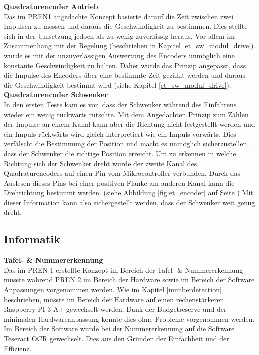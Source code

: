 \documentclass[../../main.tex]{subfiles}
\begin{document}
\textbf{Quadraturencoder Antrieb}\\
Das im PREN1 angedachte Konzept basierte darauf die Zeit zwischen zwei Impulsen zu messen und daraus die Geschwindigkeit zu bestimmen. Dies stellte sich in der Umsetzung jedoch als zu wenig zuverlässig heraus. Vor allem im Zusammenhang mit der Regelung (beschrieben in Kapitel \ref{et_sw_modul_drive}) wurde es mit der unzuverlässigen Auswertung des Encoders unmöglich eine konstante Geschwindigkeit zu halten. Daher wurde das Prinzip angepasst, dass die Impulse des Encoders über eine bestimmte Zeit gezählt werden und daraus die Geschwindigkeit bestimmt wird (siehe Kapitel \ref{et_sw_modul_drive}).\\

\textbf{Quadraturencoder Schwenker}\\
In den ersten Tests kam es vor, dass der Schwenker während des Einfahrens wieder ein wenig rückwärts rutschte. Mit dem Angedachten Prinzip zum Zählen der Impulse an einem Kanal kann aber die Richtung nicht festgestellt werden und ein Impuls rückwärts wird gleich interpretiert wie ein Impuls vorwärts. Dies verfälscht die Bestimmung der Position und macht es unmöglich sicherzustellen, dass der Schwenker die richtige Position erreicht. Um zu erkennen in welche Richtung sich der Schwenker dreht wurde der zweite Kanal des Quadraturencoders auf einen Pin vom Mikrocontroller verbunden. Durch das Auslesen dieses Pins bei einer positiven Flanke am anderen Kanal kann die Drehrichtung bestimmt werden. (siehe Abbildung \ref{fig:et_encoder} auf Seite \pageref{fig:et_encoder}) Mit dieser Information kann also sichergestellt werden, dass der Schwenker weit genug dreht.\\

\subsection{Informatik}

\textbf{Tafel- \& Nummererkennung}\\
Das im PREN 1 erstellte Konzept im Bereich der Tafel- \& Nummererkennung musste während PREN 2 im Bereich der Hardware sowie im Bereich der Software Anpassungen vorgenommen werden. Wie im Kapitel \ref{numberdetection} beschrieben, musste im Bereich der Hardware auf einen rechenstärkeren Raspberry PI 3 A+ gewechselt werden. Dank der Budgetreserve und der minimalen Hardwareanpassung konnte dies ohne Probleme vorgenommen werden. Im Bereich der Software wurde bei der Nummererkennung auf die Software Teseract OCR gewechselt. Dies aus den Gründen der Einfachheit und der Effizienz.
\end{document}
